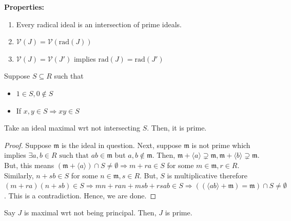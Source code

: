 \documentclass[oneside, 12pt, ]{scrbook}
\newcommand{\V}{\mathcal{V}}
\newcommand{\m}{\mathfrak{m}}
\theoremstyle{theorem}
\begin{document}
\textbf{Properties:}
\begin{enumerate}
\item Every radical ideal is an intersection of prime ideals.
\item $\V(J) = \V(\mathrm{rad}(J))$ 
\item $\V(J) = \V(J')$ implies $\mathrm{rad}(J) = \mathrm{rad}(J')$
\end{enumerate}

Suppose $S\subseteq R$ such that 
\begin{itemize}
\item $1\in S, 0 \not \in S$
\item If $x,y \in S \Rightarrow xy \in S$
\end{itemize}

\begin{proposition}
Take an ideal maximal wrt not intersecting $S$. Then, it is prime.
\end{proposition}

\begin{proof}
Suppose $\m$ is the ideal in question. Next, suppose $\m$ is not prime which implies  $\exists a,b \in R \text{ such that } ab \in \m$ but $a,b \not \in \m$. Then, $\m + \langle a \rangle \supsetneq \m , \m + \langle b \rangle \supsetneq \m$. But, this means $(\m + \langle a \rangle) \cap S \neq \emptyset \Rightarrow m + ra \in S$ for some $m\in \m , r  \in R$. Similarly, $n + sb \in S$ for some $n \in \m , s \in R$. But, $S$ is multiplicative therefore $(m+ra)(n + sb) \in S \Rightarrow mn + ran + msb + rsab \in S \Rightarrow ((\langle ab \rangle + \m)= \m) \cap S \neq \emptyset$. This is a contradiction. Hence, we are done.  
\end{proof}

\begin{proposition}
Say $J$ is maximal wrt not being principal. Then, $J$ is prime.
\end{proposition}
\end{document}
